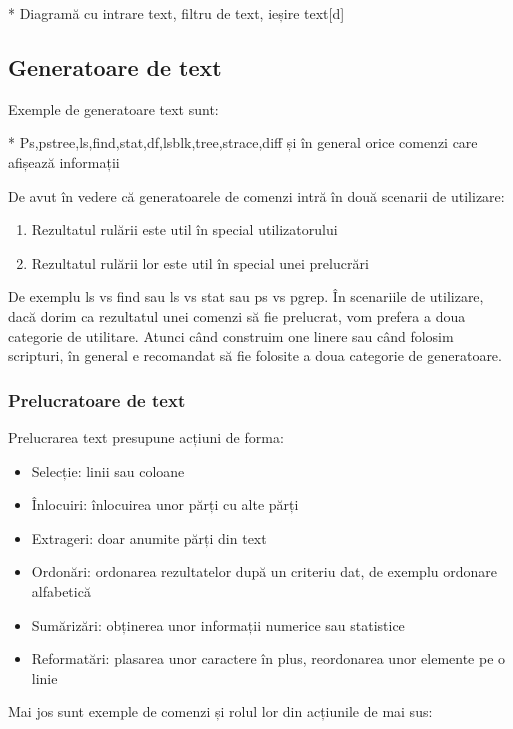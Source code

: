 * Diagramă cu intrare text, filtru de text, ieșire text[d]

\subsection{Generatoare de text}
\label{sec:cli-text-gen}

Exemple de generatoare text sunt:

* Ps,pstree,ls,find,stat,df,lsblk,tree,strace,diff și în general orice comenzi care afișează informații

De avut în vedere că generatoarele de comenzi intră în două scenarii de utilizare:

\begin{enumerate}
	\item Rezultatul rulării este util în special utilizatorului
	\item Rezultatul rulării lor este util în special unei prelucrări
\end{enumerate}

De exemplu ls vs find sau ls vs stat sau ps vs pgrep. În scenariile de
utilizare, dacă dorim ca rezultatul unei comenzi să fie prelucrat, vom prefera a
doua categorie de utilitare. Atunci când construim one linere sau când folosim
scripturi, în general e recomandat să fie folosite a doua categorie de
generatoare.

\subsubsection{Prelucratoare de text}
\label{sec:cli-text-proc}

Prelucrarea text presupune acțiuni de forma:

\begin{itemize}
	\item Selecție: linii sau coloane
	\item Înlocuiri: înlocuirea unor părți cu alte părți
	\item Extrageri: doar anumite părți din text
	\item Ordonări: ordonarea rezultatelor după un criteriu dat, de exemplu
		ordonare alfabetică
	\item Sumărizări: obținerea unor informații numerice sau statistice
	\item Reformatări: plasarea unor caractere în plus, reordonarea unor
		elemente pe o linie
\end{itemize}

Mai jos sunt exemple de comenzi și rolul lor din acțiunile de mai sus:

